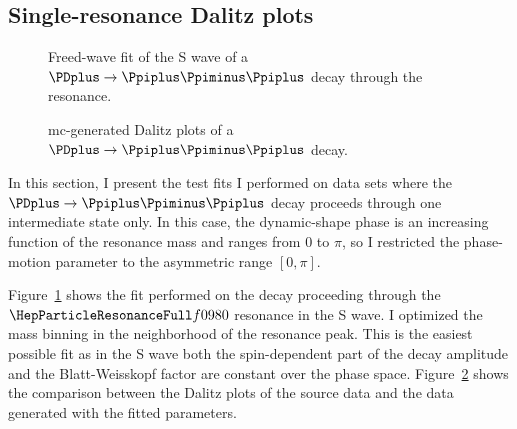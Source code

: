 \subsection{Single-resonance Dalitz plots}
\label{subsec:single_resonance_dalitz_plots}

    \begin{figure}
        \centering
        \subfloat[][\label{fig:f0_only_phase_fit}]{}

        \subfloat[][\label{fig:f0_only_magnitude}]{}
        \caption{Freed-wave fit of the S wave of a $\PDplus \to \Ppiplus\Ppiminus\Ppiplus$ decay through the \Pfnez{} resonance.~\Square} 
        \label{fig:f0_only}
    \end{figure}
    \begin{figure}
        \centering

        \caption{\ac{mc}-generated Dalitz plots of a $\PDplus \to \Ppiplus\Ppiminus\Ppiplus$ decay.~\Square}
        \label{fig:f0_only_dalitz}
    \end{figure}
    In this section, I present the test fits I performed on data sets where the $\PDplus\to\Ppiplus\Ppiminus\Ppiplus$ decay proceeds through one intermediate state only. 
    In this case, the dynamic-shape phase is an increasing function of the resonance mass and ranges from $0$ to $\pi$, so I restricted the phase-motion parameter to the asymmetric range $[0,\pi]$.


    Figure~\ref{fig:f0_only} shows the fit performed on the decay proceeding through the $\Pfnez{}$ resonance in the S wave.
    I optimized the mass binning in the neighborhood of the resonance peak.
    This is the easiest possible fit as in the S wave both the spin-dependent part of the decay amplitude and the Blatt-Weisskopf factor are constant over the phase space.
    Figure~\ref{fig:f0_only_dalitz} shows the comparison between the Dalitz plots of the source data and the data generated with the fitted parameters.


